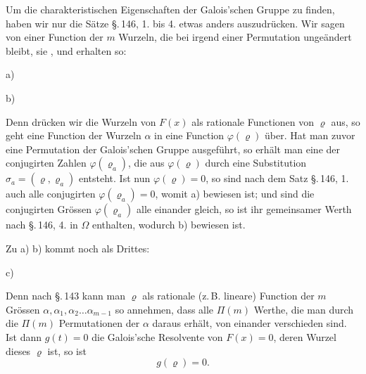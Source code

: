 
Um die charakteristischen Eigenschaften der Galois'schen Gruppe zu finden, haben wir nur die Sätze \S.\,146, 1. bis 4. etwas anders auszudrücken. Wir sagen von einer Function der $m$ Wurzeln, die bei irgend einer Permutation ungeändert bleibt, sie , und erhalten so:

a) 

b) 

Denn drücken wir die Wurzeln von $F(x)$ als rationale Functionen von $\varrho$ aus, so geht eine Function der Wurzeln $\alpha$ in eine Function $\varphi(\varrho)$ über. Hat man zuvor eine Permutation der Galois'schen Gruppe ausgeführt, so erhält man eine der conjugirten Zahlen $\varphi(\varrho_a)$, die aus $\varphi(\varrho)$ durch eine Substitution $\sigma_a = (\varrho, \varrho_a)$ entsteht. Ist nun $\varphi(\varrho) = 0$, so sind nach dem Satz \S.\,146, 1. auch alle conjugirten $\varphi(\varrho_a) = 0$, womit a) bewiesen ist; und sind die conjugirten Grössen $\varphi(\varrho_a)$ alle einander gleich, so ist ihr gemeinsamer Werth nach \S.\,146, 4. in $\Omega$ enthalten, wodurch b) bewiesen ist.

Zu a) b) kommt noch als Drittes:

c) 

Denn nach \S.\,143 kann man $\varrho$ als rationale (z.\,B. lineare) Function der $m$ Grössen $\alpha, \alpha_1, \alpha_2 \ldots \alpha_{m-1}$ so annehmen, dass alle $\Pi(m)$ Werthe, die man durch die $\Pi(m)$ Permutationen der $\alpha$ daraus erhält, von einander verschieden sind. Ist dann $g(t) = 0$ die Galois'sche Resolvente von $F(x) = 0$, deren Wurzel dieses $\varrho$ ist, so ist
\[
g(\varrho) = 0.
\]
